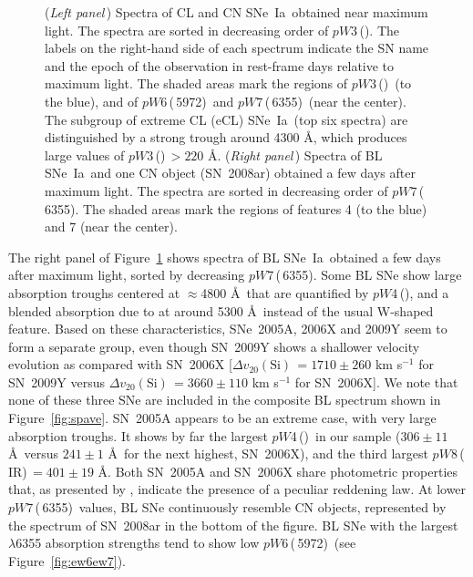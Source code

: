 \documentclass[apj]{emulateapj-rtx4}
\newcommand{\pwthree}{$pW$3\,(\ion{Mg}{2})}
\newcommand{\pwfour}{$pW$4\,(\ion{Fe}{2})}
\newcommand{\pwsix}{$pW$6\,(\ion{Si}{2}\,5972)}
\newcommand{\pwseven}{$pW$7\,(\ion{Si}{2}\,6355)}
\newcommand{\pweight}{$pW$8\,(\ion{Ca}{2}\,IR)}
\newcommand{\deltav}{$\Delta v_{20}(\mathrm{Si})$}
\newcommand{\sneia}{SNe~Ia}
\begin{document}
\begin{figure}[htpb]%
\caption{({\em Left panel\,}) Spectra of CL and CN
  \sneia\ obtained near maximum light. The spectra are sorted in
  decreasing order of \pwthree. The labels on the right-hand side of
  each spectrum indicate the SN name and the epoch of the observation
  in rest-frame days relative to maximum light. The shaded areas 
  mark the regions of \pwthree\ (to the blue), and of \pwsix\ and \pwseven\
  (near the center). The subgroup of extreme CL (eCL) \sneia\ (top six
  spectra) are distinguished by a strong trough around 4300 \AA, 
  which produces large values of \pwthree\,$>220$ \AA. 
  ({\em Right panel\,}) Spectra of BL \sneia\ and one CN object
  (SN~2008ar) obtained a few days after maximum light. The
  spectra are sorted in decreasing order of \pwseven. The shaded areas
  mark the regions of features 4 (to the blue) and 7 (near the
  center).\label{fig:spclbl}} 
\end{figure}

The right panel of Figure~\ref{fig:spclbl} shows spectra of BL
\sneia\ obtained a few days after maximum light, sorted by decreasing
\pwseven. Some BL SNe show large absorption troughs centered at  
$\approx$4800 \AA\ that are quantified by \pwfour, and a blended 
absorption due to \ion{S}{2} at around 5300 \AA\ instead of the usual
W-shaped feature. Based on these characteristics, SNe~2005A, 2006X and
2009Y seem to form a separate group, even though SN~2009Y shows a
shallower \ion{Si}{2} velocity evolution as compared with SN~2006X
[\deltav\,$=1710\pm260$ km s$^{-1}$ for SN~2009Y versus
\deltav\,$=3660\pm110$ km s$^{-1}$ for SN~2006X]. We note that none of
these three SNe are included in the composite BL spectrum shown in 
Figure~\ref{fig:spave}. SN~2005A appears
to be an extreme case, with very large absorption troughs. It
  shows by far the largest \pwfour\ in our sample ($306\pm11$ 
\AA\ versus $241\pm1$ \AA\ for the next highest, SN~2006X), and the
third largest \pweight\,$=401\pm19$ \AA.
Both SN~2005A and SN~2006X share photometric
properties that, as presented by \citet{folatelli10}, indicate the
presence of a peculiar reddening law.
At lower \pwseven\ values, BL SNe 
continuously resemble CN objects, represented by the spectrum of
SN~2008ar in the bottom of the figure. BL SNe with the largest
 $\lambda$6355 absorption strengths tend to show low
\pwsix\ (see Figure~\ref{fig:ew6ew7}). 
\end{document}
